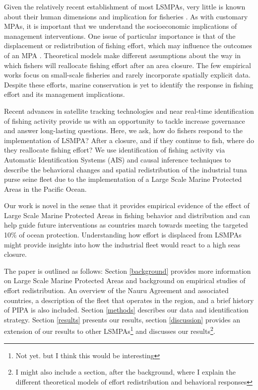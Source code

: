 \documentclass[11pt,]{article}
\let\rmarkdownfootnote\footnote%
\def\footnote{\protect\rmarkdownfootnote}
\begin{document}
Given the relatively recent establishment of most LSMPAs, very little is
known about their human dimensions and implication for fisheries
\citep{gray_2017}. As with customary MPAs, it is important that we
understand the socioeconomic implications of management interventions.
One issue of particular importance is that of the displacement or
redistribution of fishing effort, which may influence the outcomes of an
MPA \citep{smith_2003}. Theoretical models make different assumptions
about the way in which fishers will reallocate fishing effort after an
area closure. The few empirical works focus on small-scale fisheries and
rarely incorporate spatially explicit data. Despite these efforts,
marine conservation is yet to identify the response in fishing effort
and its management implications.

Recent advances in satellite tracking technologies and near real-time
identification of fishing activity provide us with an opportunity to
tackle increase governance and answer long-lasting questions. Here, we
ask, how do fishers respond to the implementation of LSMPA? After a
closure, and if they continue to fish, where do they reallocate fishing
effort? We use identification of fishing activity via Automatic
Identification Systems (AIS) and causal inference techniques to describe
the behavioral changes and spatial redistribution of the industrial tuna
purse seine fleet due to the implementation of a Large Scale Marine
Protected Areas in the Pacific Ocean.

Our work is novel in the sense that it provides empirical evidence of
the effect of Large Scale Marine Protected Areas in fishing behavior and
distribution and can help guide future interventions as countries march
towards meeting the targeted 10\% of ocean protection. Understanding how
effort is displaced from LSMPAs might provide insights into how the
industrial fleet would react to a high seas closure.

The paper is outlined as follows: Section \ref{background} provides more
information on Large Scale Marine Protected Areas and background on
empirical studies of effort redistribution. An overview of the Nauru
Agreement and associated countries, a description of the fleet that
operates in the region, and a brief history of PIPA is also included.
Section \ref{methods} describes our data and identification strategy.
Section \ref{results} presents our results, section \ref{discussion}
provides an extension of our results to other
LSMPAs\footnote{Not yet. but I think this would be interesting} and
discusses our
results\footnote{I might also include a section, after the background, where I explain the different theoretical models of effort redistribution and behavioral responses}.
\end{document}
